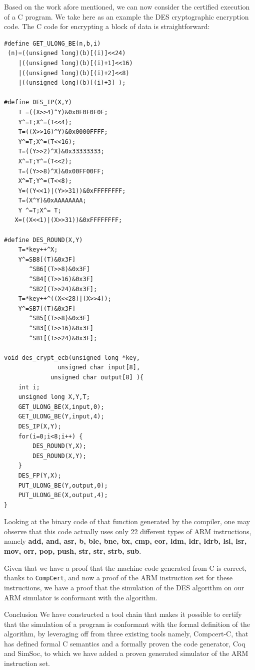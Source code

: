 \documentclass[twocolumn]{article}
\makeatletter
\def\section{\@startsection {section}{1}{\z@}{20pt plus 2pt minus 2pt}
{8pt plus 2pt minus 2pt}{\centering\normalsize\sc
\edef\@svsec{\thesection.\ }}}
\def\thesection{\Roman{section}}
\newcommand{\compcert}{\texttt{CompCert}\xspace}
\makeatother
\begin{document}
Based on the work afore mentioned, we can now consider the certified
execution of a C program. We take here as an example the DES
cryptographic encryption code.  The C code for encrypting a block of
data is straightforward:
\small{\begin{verbatim}
#define GET_ULONG_BE(n,b,i)
 (n)=((unsigned long)(b)[(i)]<<24)
    |((unsigned long)(b)[(i)+1]<<16)
    |((unsigned long)(b)[(i)+2]<<8)
    |((unsigned long)(b)[(i)+3] );

#define DES_IP(X,Y)
    T =((X>>4)^Y)&0x0F0F0F0F;
    Y^=T;X^=(T<<4);
    T=((X>>16)^Y)&0x0000FFFF;
    Y^=T;X^=(T<<16);
    T=((Y>>2)^X)&0x33333333;
    X^=T;Y^=(T<<2);
    T=((Y>>8)^X)&0x00FF00FF;
    X^=T;Y^=(T<<8);
    Y=((Y<<1)|(Y>>31))&0xFFFFFFFF;
    T=(X^Y)&0xAAAAAAAA;
    Y ^=T;X^= T;
   X=((X<<1)|(X>>31))&0xFFFFFFFF;

#define DES_ROUND(X,Y)
    T=*key++^X;
    Y^=SB8[(T)&0x3F]
       ^SB6[(T>>8)&0x3F]
       ^SB4[(T>>16)&0x3F]
       ^SB2[(T>>24)&0x3F];
    T=*key++^((X<<28)|(X>>4));
    Y^=SB7[(T)&0x3F]
       ^SB5[(T>>8)&0x3F]
       ^SB3[(T>>16)&0x3F]
       ^SB1[(T>>24)&0x3F];

void des_crypt_ecb(unsigned long *key,
               unsigned char input[8],
             unsigned char output[8] ){
    int i;
    unsigned long X,Y,T;
    GET_ULONG_BE(X,input,0);
    GET_ULONG_BE(Y,input,4);
    DES_IP(X,Y);
    for(i=0;i<8;i++) {
        DES_ROUND(Y,X);
        DES_ROUND(X,Y);
    }
    DES_FP(Y,X);
    PUT_ULONG_BE(Y,output,0);
    PUT_ULONG_BE(X,output,4);
}
\end{verbatim}
}

Looking at the binary code of that function generated by the compiler,
one may observe that this code actually uses only 22 different types of ARM
instructions, namely \textbf{ add, and, asr, b, ble, bne, bx, cmp,
  eor, ldm, ldr, ldrb, lsl, lsr, mov, orr, pop, push, str, str, strb,
  sub}.

Given that we have a proof that the machine code generated from C is
correct, thanks to \compcert, and now a proof of the ARM instruction
set for these instructions, we have a proof that the simulation of the
DES algorithm on our ARM simulator is conformant with the algorithm.


\section{Conclusion}
\label{conclusion}
We have constructed a tool chain that makes it possible to certify
that the simulation of a program is conformant with the formal
definition of the algorithm, by leveraging off from three existing
tools namely, Compcert-C, that has defined formal C semantics and a
formally proven the code generator, Coq and SimSoc, to which we have
added a proven generated simulator of the ARM instruction set.
\end{document}

